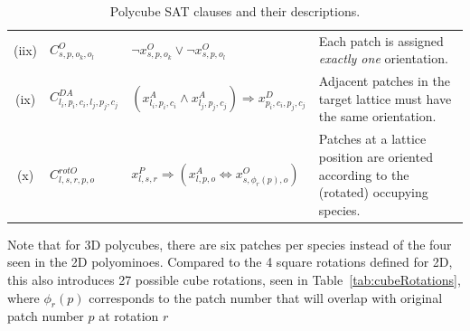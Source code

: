 \begin{table}[h!]
\begin{tabular}{|c|l|l|p{5cm}|}
        (iix) &  \(C^{O}_{s,p,o_k,o_l}\) & \(\neg x_{s, p, o_k}^{O} \lor \neg x_{s, p, o_l}^{O}\) & \small{Each patch is assigned \textit{exactly one} orientation.} \\ %
        (ix) & \(C^{DA}_{l_i,p_i,c_i,l_j,p_j,c_j}\) & \(\left(x_{l_i,p_i,c_i}^{A} \land x_{l_j,p_j,c_j}^{A} \right) \Rightarrow x_{p_i,c_i,p_j,c_j}^{D}\) & \small{Adjacent patches in the target lattice must have the same orientation.} \\ %
        (x) & \(C^{rotO}_{l,s,r,p,o}\) & \(x_{l,s,r}^{P} \Rightarrow \left(x_{l,p,o}^{A} \Leftrightarrow x_{s, \phi_r(p), o}^{O}\right)\) & \small{Patches at a lattice position are oriented according to the (rotated) occupying species.} \\ %
        \hline
    \end{tabular}
    \caption{Polycube SAT clauses and their descriptions.}
    \label{tab:sat_clauses}
    \end{table}

Note that for 3D polycubes, there are six patches per species instead of the four seen in the 2D polyominoes. Compared to the 4 square rotations defined for 2D, this also introduces 27 possible cube rotations, seen in Table~\ref{tab:cubeRotations}, where $\phi_r(p)$ corresponds to the patch number that will overlap with original patch number $p$ at rotation $r$

